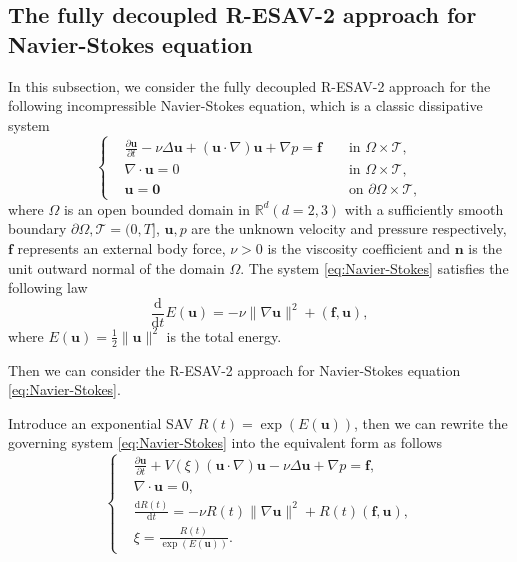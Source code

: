 \documentclass[final,review,onefignum,onetabnum]{siamart190516}
\theoremstyle{plain}
\begin{document}
 \subsection{The fully decoupled R-ESAV-2 approach for Navier-Stokes equation} 
In this subsection, we consider the fully decoupled R-ESAV-2 approach for the following incompressible Navier-Stokes equation, which is a classic dissipative system
\begin{equation}\label{eq:Navier-Stokes}
\left\{\begin{aligned}
& \frac{\partial \mathbf{u}}{\partial t}-\nu \Delta \mathbf{u}+(\mathbf{u} \cdot \nabla) \mathbf{u}+\nabla p =\mathbf{f} & & \text { in } \Omega \times \mathcal{T} ,\\
& \nabla \cdot \mathbf{u} =0 & & \text { in } \Omega \times \mathcal{T}, \\ 
& \mathbf{u} =\mathbf{0} & & \text { on } \partial \Omega \times \mathcal{T}, 
\end{aligned}\right.
\end{equation}
where $\Omega$ is an open bounded domain in $\mathbb{R}^{d} (d=2,3)$ with a sufficiently smooth boundary $\partial \Omega, \mathcal{T}=(0, T]$, $\mathbf{u}, p$ are the unknown velocity and pressure respectively, $\mathbf{f}$ represents an external body force, $\nu>0$ is the viscosity coefficient and $\mathbf{n}$ is the unit outward normal of the domain $\Omega$. 
The system \eqref{eq:Navier-Stokes} satisfies the following law
\begin{equation}\label{eq:Navier-Stokes-energy-law}
	\frac{\mathrm{d}}{\mathrm{d} t} E(\mathbf{u})=-\nu\|\nabla\mathbf{u}\|^{2} + \left(\mathbf{f}, \mathbf{u}\right),
\end{equation}     
where $E(\mathbf{u})=\frac{1}{2}\|\mathbf{u}\|^{2}$ is the total energy. 

Then we can consider the R-ESAV-2 approach for Navier-Stokes equation \eqref{eq:Navier-Stokes}. 

Introduce an exponential SAV $R(t)=\exp\left(E\left(\mathbf{u}\right)\right)$, then we can rewrite the governing system \eqref{eq:Navier-Stokes} into the equivalent form as follows 
\begin{equation}\label{eq:Navier-Stokes-ESAV-2}
\left\{\begin{aligned}
& \frac{\partial \mathbf{u}}{\partial t}+V(\xi)(\mathbf{u} \cdot \nabla) \mathbf{u}-\nu \Delta \mathbf{u}+\nabla p =\mathbf{f},\\
& \nabla \cdot \mathbf{u} =0, \\ 
& \frac{\mathrm{d} R(t)}{\mathrm{d} t}=-\nu R(t) \|\nabla \mathbf{u}\|^{2} + R(t)(\mathbf{f}, \mathbf{u}), \\
& \xi = \frac{R(t)}{\exp\left(E(\mathbf{u})\right)}.
\end{aligned}\right.
\end{equation}
\end{document}
